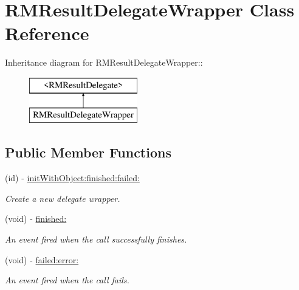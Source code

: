 \hypertarget{interface_r_m_result_delegate_wrapper}{
\section{RMResultDelegateWrapper Class Reference}
\label{interface_r_m_result_delegate_wrapper}
}
Inheritance diagram for RMResultDelegateWrapper::\begin{figure}[H]
\begin{center}
\leavevmode
\includegraphics[height=2cm]{interface_r_m_result_delegate_wrapper}
\end{center}
\end{figure}
\subsection*{Public Member Functions}
\begin{DoxyCompactItemize}
\item 
(id) -\/ \hyperlink{interface_r_m_result_delegate_wrapper_ab2fbcbd604edd4ca182125604fecc51e}{initWithObject:finished:failed:}
\begin{DoxyCompactList}\small\item\em Create a new delegate wrapper. \item\end{DoxyCompactList}\item 
(void) -\/ \hyperlink{interface_r_m_result_delegate_wrapper_ac631e09ab641294f124b0e7d81b455c3}{finished:}
\begin{DoxyCompactList}\small\item\em An event fired when the call successfully finishes. \item\end{DoxyCompactList}\item 
(void) -\/ \hyperlink{interface_r_m_result_delegate_wrapper_ad4fccdd6b67ba89b4abe76f64708b82c}{failed:error:}
\begin{DoxyCompactList}\small\item\em An event fired when the call fails. \item\end{DoxyCompactList}\end{DoxyCompactItemize}
